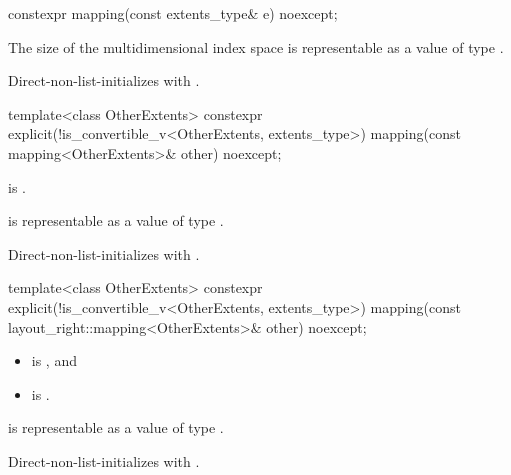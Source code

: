 %
\begin{itemdecl}
constexpr mapping(const extents_type& e) noexcept;
\end{itemdecl}

\begin{itemdescr}
\pnum
\expects
The size of the multidimensional index space 
is representable as a value of type .

\pnum
\effects
Direct-non-list-initializes  with .
\end{itemdescr}

%
\begin{itemdecl}
template<class OtherExtents>
  constexpr explicit(!is_convertible_v<OtherExtents, extents_type>)
    mapping(const mapping<OtherExtents>& other) noexcept;
\end{itemdecl}

\begin{itemdescr}
\pnum
\constraints
{} is .

\pnum
\expects
{} is representable as
a value of type .

\pnum
\effects
Direct-non-list-initializes  with .
\end{itemdescr}

%
\begin{itemdecl}
template<class OtherExtents>
  constexpr explicit(!is_convertible_v<OtherExtents, extents_type>)
    mapping(const layout_right::mapping<OtherExtents>& other) noexcept;
\end{itemdecl}

\begin{itemdescr}
\pnum
\constraints
\begin{itemize}
\item
{} is , and
\item
{} is .
\end{itemize}

\pnum
\expects
{} is representable as
a value of type .

\pnum
\effects
Direct-non-list-initializes  with .
\end{itemdescr}

